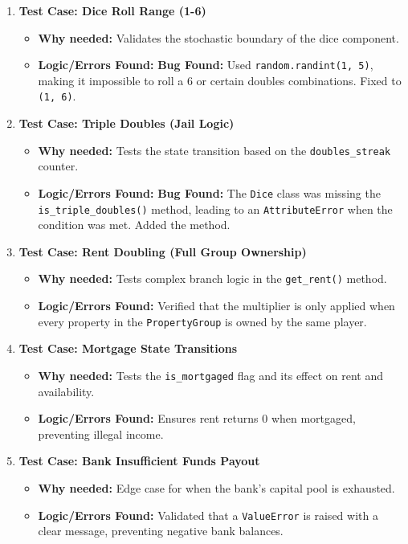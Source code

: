 \documentclass{article}
\begin{document}
\begin{enumerate}
    \item \textbf{Test Case: Dice Roll Range (1-6)}
    \begin{itemize}
        \item \textbf{Why needed:} Validates the stochastic boundary of the dice component.
        \item \textbf{Logic/Errors Found:} \textbf{Bug Found:} Used \texttt{random.randint(1, 5)}, making it impossible to roll a 6 or certain doubles combinations. Fixed to \texttt{(1, 6)}.
    \end{itemize}

    \item \textbf{Test Case: Triple Doubles (Jail Logic)}
    \begin{itemize}
        \item \textbf{Why needed:} Tests the state transition based on the \texttt{doubles_streak} counter.
        \item \textbf{Logic/Errors Found:} \textbf{Bug Found:} The \texttt{Dice} class was missing the \texttt{is_triple_doubles()} method, leading to an \texttt{AttributeError} when the condition was met. Added the method.
    \end{itemize}

    \item \textbf{Test Case: Rent Doubling (Full Group Ownership)}
    \begin{itemize}
        \item \textbf{Why needed:} Tests complex branch logic in the \texttt{get_rent()} method.
        \item \textbf{Logic/Errors Found:} Verified that the multiplier is only applied when every property in the \texttt{PropertyGroup} is owned by the same player.
    \end{itemize}

    \item \textbf{Test Case: Mortgage State Transitions}
    \begin{itemize}
        \item \textbf{Why needed:} Tests the \texttt{is_mortgaged} flag and its effect on rent and availability.
        \item \textbf{Logic/Errors Found:} Ensures rent returns 0 when mortgaged, preventing illegal income.
    \end{itemize}

    \item \textbf{Test Case: Bank Insufficient Funds Payout}
    \begin{itemize}
        \item \textbf{Why needed:} Edge case for when the bank's capital pool is exhausted.
        \item \textbf{Logic/Errors Found:} Validated that a \texttt{ValueError} is raised with a clear message, preventing negative bank balances.
    \end{itemize}


\end{enumerate}
\end{document}
